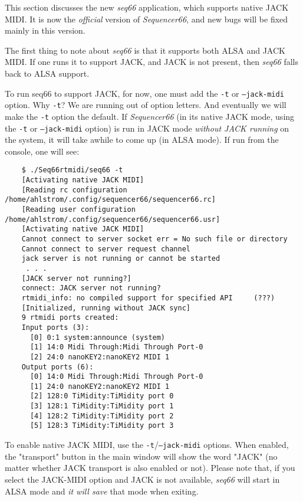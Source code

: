    This section discusses the new \textsl{seq66} application, which supports
   native JACK MIDI.  It is now the \textsl{official} version of
   \textsl{Sequencer66}, and new bugs will be fixed mainly in this version.

   The first thing to note about \textsl{seq66}
   is that it supports both ALSA and JACK
   MIDI.  If one runs it to support JACK, and JACK is not present, then
   \textsl{seq66}
   falls back to ALSA support.

   To run seq66 to support JACK, for now, one must add the
   \texttt{-t} or \texttt{--jack-midi}
   option.  Why \texttt{-t}?  We are running out of option letters.
   And eventually we will make the \texttt{-t} option the default.
   If \textsl{Sequencer66} (in its native JACK mode, using the
   \texttt{-t} or \texttt{--jack-midi} option)
   is run in JACK mode \textsl{without JACK running} on
   the system, it will take awhile to come up (in ALSA mode).  If run from the
   console, one will see:

\begin{verbatim}
	$ ./Seq66rtmidi/seq66 -t
	[Activating native JACK MIDI]
	[Reading rc configuration /home/ahlstrom/.config/sequencer66/sequencer66.rc]
	[Reading user configuration /home/ahlstrom/.config/sequencer66/sequencer66.usr]
	[Activating native JACK MIDI]
	Cannot connect to server socket err = No such file or directory
	Cannot connect to server request channel
	jack server is not running or cannot be started
     . . .
	[JACK server not running?]
	connect: JACK server not running?
	rtmidi_info: no compiled support for specified API     (???)
	[Initialized, running without JACK sync]
	9 rtmidi ports created:
	Input ports (3):
	  [0] 0:1 system:announce (system)
	  [1] 14:0 Midi Through:Midi Through Port-0
	  [2] 24:0 nanoKEY2:nanoKEY2 MIDI 1
	Output ports (6):
	  [0] 14:0 Midi Through:Midi Through Port-0 
	  [1] 24:0 nanoKEY2:nanoKEY2 MIDI 1 
	  [2] 128:0 TiMidity:TiMidity port 0 
	  [3] 128:1 TiMidity:TiMidity port 1 
	  [4] 128:2 TiMidity:TiMidity port 2 
	  [5] 128:3 TiMidity:TiMidity port 3 
\end{verbatim}

   To enable native JACK MIDI, use the
   \texttt{-t}/\texttt{--jack-midi} options.
   When enabled, the "transport" button in the main window will show the word
   "JACK" (no matter whether JACK transport is also enabled or not).
   Please note that, if you
   select the JACK-MIDI option and JACK is not available,
   \textsl{seq66} will start in
   ALSA mode and \textsl{it will save} that mode when exiting.

